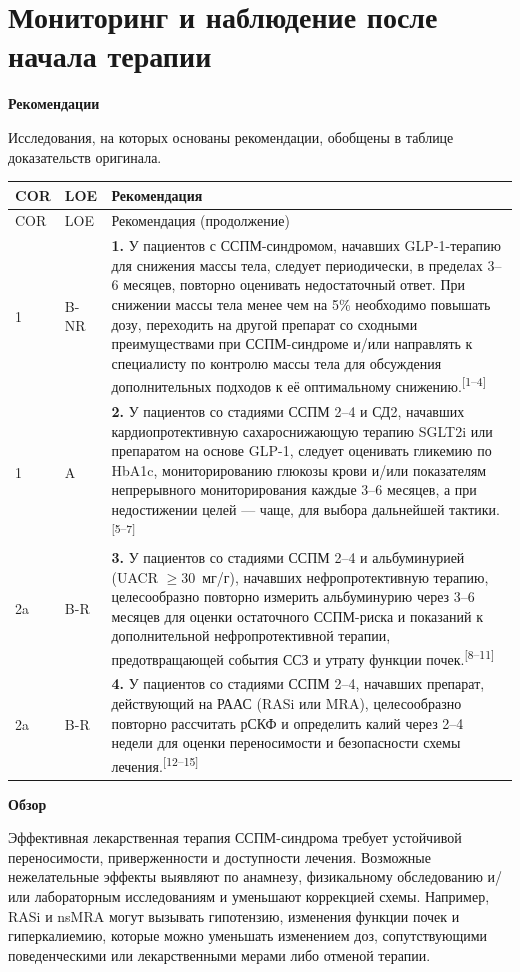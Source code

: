 \documentclass[11pt,a4paper]{article}
\newcommand{\src}[1]{\textsuperscript{[#1]}}
\newcommand{\heading}[1]{\par\medskip\textbf{#1}\par}
\begin{document}
\section{Мониторинг и наблюдение после начала терапии}
\heading{Рекомендации}
Исследования, на которых основаны рекомендации, обобщены в таблице доказательств оригинала.
{\small
\begin{longtable}{P{0.07\textwidth}P{0.11\textwidth}P{0.75\textwidth}}
\toprule COR & LOE & Рекомендация\\\midrule
\endfirsthead
\toprule COR & LOE & Рекомендация (продолжение)\\\midrule
{} & B-NR & \textbf{1.} У пациентов с ССПМ-синдромом, начавших GLP-1-терапию для снижения массы тела, следует периодически, в пределах 3--6 месяцев, повторно оценивать недостаточный ответ. При снижении массы тела менее чем на 5\% необходимо повышать дозу, переходить на другой препарат со сходными преимуществами при ССПМ-синдроме и/или направлять к специалисту по контролю массы тела для обсуждения дополнительных подходов к её оптимальному снижению.\src{1--4}\\[5pt]
1 & A & \textbf{2.} У пациентов со стадиями ССПМ 2--4 и СД2, начавших кардиопротективную сахароснижающую терапию SGLT2i или препаратом на основе GLP-1, следует оценивать гликемию по HbA1c, мониторированию глюкозы крови и/или показателям непрерывного мониторирования каждые 3--6 месяцев, а при недостижении целей --- чаще, для выбора дальнейшей тактики.\src{5--7}\\[5pt]
2a & B-R & \textbf{3.} У пациентов со стадиями ССПМ 2--4 и альбуминурией (UACR $\geq30$~мг/г), начавших нефропротективную терапию, целесообразно повторно измерить альбуминурию через 3--6 месяцев для оценки остаточного ССПМ-риска и показаний к дополнительной нефропротективной терапии, предотвращающей события ССЗ и утрату функции почек.\src{8--11}\\[5pt]
2a & B-R & \textbf{4.} У пациентов со стадиями ССПМ 2--4, начавших препарат, действующий на РААС (RASi или MRA), целесообразно повторно рассчитать рСКФ и определить калий через 2--4 недели для оценки переносимости и безопасности схемы лечения.\src{12--15}\\
\bottomrule
\end{longtable}
}

\heading{Обзор}
Эффективная лекарственная терапия ССПМ-синдрома требует устойчивой переносимости, приверженности и доступности лечения. Возможные нежелательные эффекты выявляют по анамнезу, физикальному обследованию и/или лабораторным исследованиям и уменьшают коррекцией схемы. Например, RASi и nsMRA могут вызывать гипотензию, изменения функции почек и гиперкалиемию, которые можно уменьшать изменением доз, сопутствующими поведенческими или лекарственными мерами либо отменой терапии.
\end{document}
